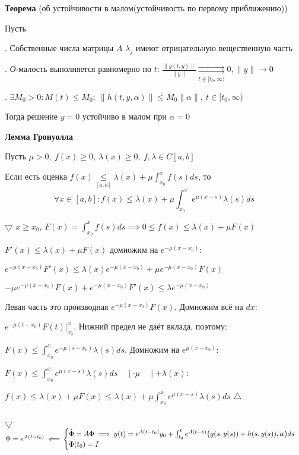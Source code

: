 \documentclass[12pt, a4paper]{article}
\begin{document}
  \textbf{Теорема} (об устойчивости в малом(устойчивость по первому приближению))

  Пусть

  . Собственные числа матрицы $A$ $\lambda_j$ имеют отрицательную вещественную часть

  . \textit{О}-малость выполняется равномерно по $t$: $\frac{\| g(t,y) \|}{\|y\|} \underset{t\in[t_0, \infty)}{\rightrightarrows} 0, \|y\| \to 0$

  . $\exists M_0 > 0: M(t) \le M_0; \ \| h(t,y,\alpha)\| \le M_0\|\alpha\|,\ t \in [t_0, \infty)$

  Тогда решение $y=0$ устойчиво в малом при $\alpha = 0$

  \textbf{Лемма Гронуолла}

  Пусть $\mu > 0, \ f(x) \ge 0,\  \lambda(x) \ge 0,\ f, \lambda \in C[a,b]$

  Если есть оценка $f(x) \underset{[a,b]}{\le} \lambda(x) + \mu \int^x_{x_0} f(s)ds$, то 
  $$\forall x \in [a,b]: f(x) \le \lambda(x) + \mu \int^x_{x_0} e^{\mu (x-s)}\lambda(s) ds$$

  $\bigtriangledown$ $x \ge x_0$, \quad $F(x) = \int^x_{x_0}f(s)ds \implies 0 \le f(x) \le \lambda(x) + \mu F(x)$

  $F'(x) \le \lambda(x) + \mu F(x)$ домножим на $e^{-\mu(x-x_0)}$: 

  $e^{-\mu(x-x_0)}F'(x) \le \lambda(x)e^{-\mu(x-x_0)} + \mu e^{-\mu(x-x_0)}F(x)$

  $-\mu e^{-\mu(x-x_0)} F(x) + e^{-\mu(x-x_0)}F'(x) \le \lambda e^{-\mu(x-x_0)}$

  Левая часть это производная $e^{-\mu(x-x_0)}F(x)$. Домножим всё на $dx$:

  $e^{-\mu(t-x_0)}F(t) \big|^{x}_{x_0}$. Нижний предел не даёт вклада, поэтому:

  $F(x) \le \int^x_{x_0}e^{-\mu(s-x_0)}\lambda(s)ds$. Домножим на $e^{\mu(x-x_0)}$:

  $F(x) \le \int^x_{x_0} e^{\mu(x-s)}\lambda(s)ds \quad \mid \cdot \mu \quad \mid + \lambda(x)$:
  
  $f(x) \le \lambda(x) + \mu F(x) \le \lambda(x) + \mu\int^x_{x_0}e^{\mu(x-s)}\lambda(s)ds$ \quad $\bigtriangleup$

  \par $ $

  $\bigtriangledown$
  $
  \Phi = e^{A(t-t_0)} \impliedby 
  \\\\
  \begin{cases}
    \dot\Phi = A\Phi \implies y(t) = e^{A(t-t_0)}y_0 + \int^t_{t_0}e^{A(t-s)}\big(g(s,y(s)) + h(s, y(s)), \alpha\big)ds \\
     \Phi(t_0) = I
  \end{cases}$
\end{document}
